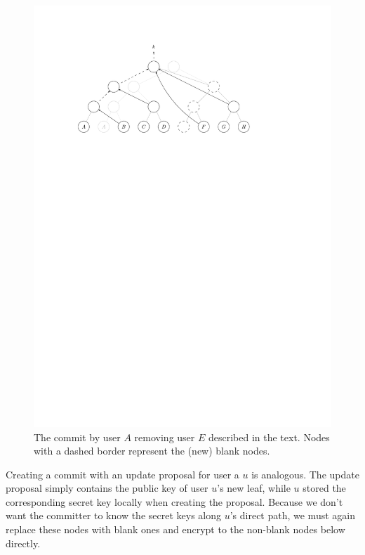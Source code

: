 \begin{figure}
	\begin{center}
		\includegraphics{figures/treekem-remove}
	\end{center}
	\caption{The commit by user $A$ removing user $E$ described in the text. Nodes with a dashed border represent the (new) blank nodes.}\label{fig:treekem-remove}
\end{figure}

Creating a commit with an update proposal for user a $u$ is analogous. The update proposal simply contains the public key of user $u$'s new leaf, while $u$ stored the corresponding secret key locally when creating the proposal. Because we don't want the committer to know the secret keys along $u$'s direct path, we must again replace these nodes with blank ones and encrypt to the non-blank nodes below directly.

